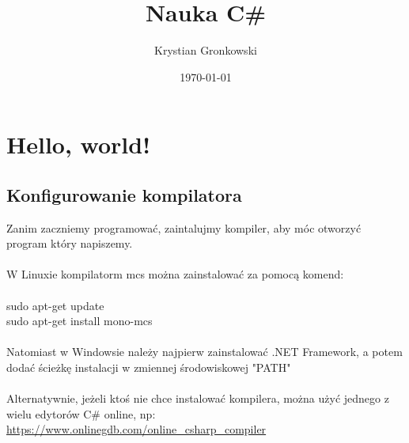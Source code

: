 \documentclass[a4paper]{article}
\title{Nauka C\#}
\author{Krystian Gronkowski}
\date{\today}
\theoremstyle{definition}
\begin{document}

\maketitle
\tableofcontents

\pagebreak
\section{Hello, world!}
\subsection{Konfigurowanie kompilatora}
Zanim zaczniemy programować, zaintalujmy kompiler, aby móc otworzyć program który napiszemy.
\\\\W Linuxie kompilatorm mcs można zainstalować za pomocą komend:
\\\\sudo apt-get update
\\sudo apt-get install mono-mcs
\\\\Natomiast w Windowsie należy najpierw zainstalować .NET Framework, a potem dodać ścieżkę instalacji w zmiennej środowiskowej "PATH"
\\\\Alternatywnie, jeżeli ktoś nie chce instalować kompilera, można użyć jednego z wielu edytorów C\# online, np: \url{https://www.onlinegdb.com/online_csharp_compiler}
\end{document}
